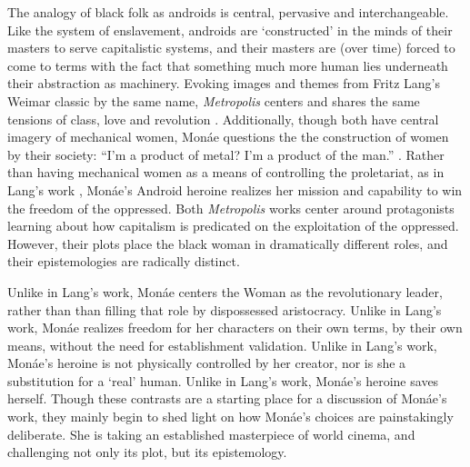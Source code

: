 \documentclass[a4paper, 11pt]{article} %
\begin{document}
The analogy of black folk as androids is central, pervasive and interchangeable. 
Like the system of enslavement, androids are `constructed' in the minds of their masters to serve capitalistic systems, and their masters are (over time) forced to come to terms with the fact that something much more human lies underneath their abstraction as machinery.
Evoking images and themes from Fritz Lang's Weimar classic by the same name, \emph{Metropolis} centers and shares the same tensions of class, love and revolution \cite{metropolis}.
Additionally, though both have central imagery of mechanical women, Mon\'ae questions the the construction of women by their society: ``I'm a product of metal? I'm a product of the man.'' \cite{happyhunting}. 
Rather than having mechanical women as a means of controlling the proletariat, as in Lang's work \cite{metropolis}, Mon\'ae's Android heroine realizes her mission and capability to win the freedom of the oppressed.
Both \emph{Metropolis} works center around protagonists learning about how capitalism is predicated on the exploitation of the oppressed.
However, their plots place the black woman in dramatically different roles, and their epistemologies are radically distinct.

Unlike in Lang's work, Mon\'ae centers the Woman as the revolutionary leader, rather than than filling that role by dispossessed aristocracy.
Unlike in Lang's work, Mon\'ae realizes freedom for her characters on their own terms, by their own means, without the need for establishment validation.
Unlike in Lang's work, Mon\'ae's heroine is not physically controlled by her creator, nor is she a substitution for a `real' human.
Unlike in Lang's work, Mon\'ae's heroine saves herself.
Though these contrasts are a starting place for a discussion of Mon\'ae's work, they mainly begin to shed light on how Mon\'ae's choices are painstakingly deliberate.
She is taking an established masterpiece of world cinema, and challenging not only its plot, but its epistemology.
\end{document}
